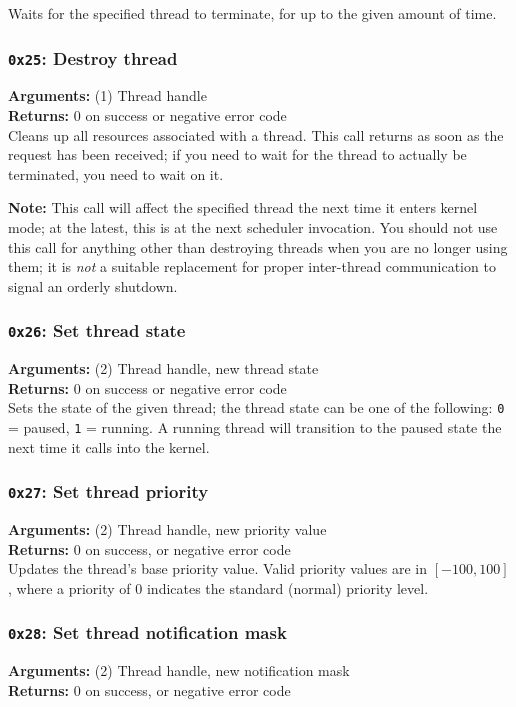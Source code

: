 \documentclass[11pt]{article}
\begin{document}
Waits for the specified thread to terminate, for up to the given amount of time.

\subsubsection{{\tt 0x25}: Destroy thread}
\textbf{Arguments:} (1) Thread handle \\
\textbf{Returns:} 0 on success or negative error code \\

Cleans up all resources associated with a thread. This call returns as soon as the request has been received; if you need to wait for the thread to actually be terminated, you need to wait on it.

\textbf{Note:} This call will affect the specified thread the next time it enters kernel mode; at the latest, this is at the next scheduler invocation. You should not use this call for anything other than destroying threads when you are no longer using them; it is \textit{not} a suitable replacement for proper inter-thread communication to signal an orderly shutdown.

\subsubsection{{\tt 0x26}: Set thread state}
\textbf{Arguments:} (2) Thread handle, new thread state \\
\textbf{Returns:} 0 on success or negative error code \\

Sets the state of the given thread; the thread state can be one of the following: \texttt{0} = paused, \texttt{1} = running. A running thread will transition to the paused state the next time it calls into the kernel.

\subsubsection{{\tt 0x27}: Set thread priority}
\textbf{Arguments:} (2) Thread handle, new priority value \\
\textbf{Returns:} 0 on success, or negative error code \\

Updates the thread's base priority value. Valid priority values are in $[-100, 100]$, where a priority of $0$ indicates the standard (normal) priority level.

\subsubsection{{\tt 0x28}: Set thread notification mask}
\textbf{Arguments:} (2) Thread handle, new notification mask \\
\textbf{Returns:} 0 on success, or negative error code \\
\end{document}

